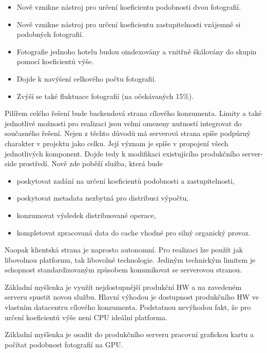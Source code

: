 \begin{itemize}
	\setlength{\parskip}{0pt}
	\setlength{\itemsep}{0pt}
	\item {Nově vznikne nástroj pro určení koeficientu podobnosti dvou fotografií.}
	\item {Nově vznikne nástroj pro určení koeficientu zastupitelnosti vzájemně si podobných fotografií.}
	\item {Fotografie jednoho hotelu budou oindexovány a vnitřně škálovány do skupin pomocí koeficientů výše.}
	\item {Dojde k navýšení celkového počtu fotografií.}
	\item {Zvýší se také fluktuace fotografií (na očekávaných 15\%).}
\end{itemize}

Pilířem celého řešení bude backendová strana cílového konzumenta. Limity a také jednotlivé možnosti pro realizaci jsou velmi omezeny nutností integrovat do současného řešení. Nejen z těchto důvodů má serverová strana spíše podpůrný charakter v projektu jako celku. Její význam je spíše v propojení všech jednotlivých komponent. Dojde tedy k modifikaci existujícího produkčního server-side prostředí. Nově zde poběží služba, která bude
\begin{itemize}
	\setlength{\parskip}{0pt}
	\setlength{\itemsep}{0pt}
	\item {poskytovat zadání na určení koeficientů podobnosti a zastupitelnosti,}
	\item {poskytovat metadata nezbytná pro distribuci výpočtu,}
	\item {konzumovat výsledek distribuované operace,}
	\item {kompletovat zpracovaná data do cache vhodné pro silný organický provoz.}
\end{itemize}
Naopak klientská strana je naprosto autonomní. Pro realizaci lze použít jak libovolnou platformu, tak libovolné technologie. Jediným technickým limitem je schopnost standardizovaným způsobem komunikovat se serverovou stranou.

Základní myšlenka je využít nejdostupnější produkční HW a na zavedeném serveru spustit novou službu. Hlavní výhodou je dostupnost produkčního HW ve vlastním datacentru cílového konzumenta. Podstatnou nevýhodou fakt, že pro určení koeficientů výše není CPU ideální platforma.

Základní myšlenka je osadit do produkčního serveru pracovní grafickou kartu a počítat podobnost fotografií na GPU.

